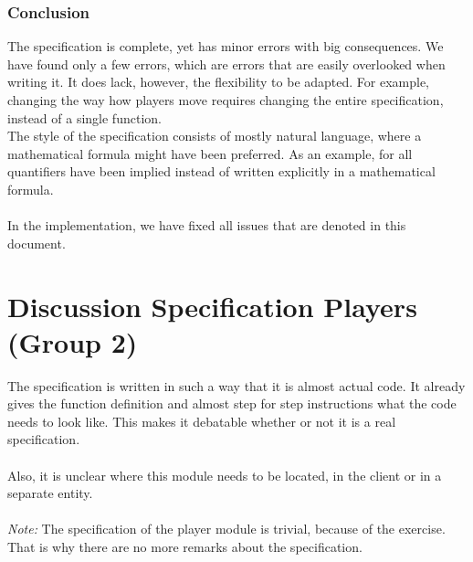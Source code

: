 \documentclass[a4paper,twoside,11pt]{article}
\begin{document}

  \subsubsection{Conclusion} %
  \label{sub:conclusion}

  The specification is complete, yet has minor errors with big consequences. We have found only a few errors, which are errors that are easily overlooked when writing it. It does lack, however, the flexibility to be adapted. For example, changing the way how players move requires changing the entire specification, instead of a single function. \\
  The style of the specification consists of mostly natural language, where a mathematical formula might have been preferred. As an example, for all quantifiers have been implied instead of written explicitly in a mathematical formula. \\ \\
  In the implementation, we have fixed all issues that are denoted in this document.



\section{Discussion Specification Players (Group 2)} %
\label{cha:discussion_specification_players_group_2_}

    The specification is written in such a way that it is almost actual code. It already gives the function definition and almost step for step instructions what the code needs to look like. This makes it debatable whether or not it is a real specification. \\ \\
    Also, it is unclear where this module needs to be located, in the client or in a separate entity. \\ \\
    
    \emph{Note:} The specification of the player module is trivial, because of the exercise. That is why there are no more remarks about the specification.
\end{document}
